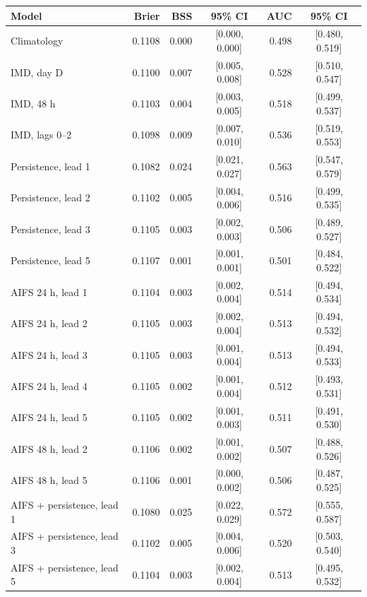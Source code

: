 \begin{tabular}{lrrcrc}\toprule
Model & Brier & BSS & 95\% CI & AUC & 95\% CI \\ \midrule
Climatology & 0.1108 & 0.000 & [0.000, 0.000] & 0.498 & [0.480, 0.519] \\
IMD, day D & 0.1100 & 0.007 & [0.005, 0.008] & 0.528 & [0.510, 0.547] \\
IMD, 48 h & 0.1103 & 0.004 & [0.003, 0.005] & 0.518 & [0.499, 0.537] \\
IMD, lags 0--2 & 0.1098 & 0.009 & [0.007, 0.010] & 0.536 & [0.519, 0.553] \\
\midrule
Persistence, lead 1 & 0.1082 & 0.024 & [0.021, 0.027] & 0.563 & [0.547, 0.579] \\
Persistence, lead 2 & 0.1102 & 0.005 & [0.004, 0.006] & 0.516 & [0.499, 0.535] \\
Persistence, lead 3 & 0.1105 & 0.003 & [0.002, 0.003] & 0.506 & [0.489, 0.527] \\
Persistence, lead 5 & 0.1107 & 0.001 & [0.001, 0.001] & 0.501 & [0.484, 0.522] \\
\midrule
AIFS 24 h, lead 1 & 0.1104 & 0.003 & [0.002, 0.004] & 0.514 & [0.494, 0.534] \\
AIFS 24 h, lead 2 & 0.1105 & 0.003 & [0.002, 0.004] & 0.513 & [0.494, 0.532] \\
AIFS 24 h, lead 3 & 0.1105 & 0.003 & [0.001, 0.004] & 0.513 & [0.494, 0.533] \\
AIFS 24 h, lead 4 & 0.1105 & 0.002 & [0.001, 0.004] & 0.512 & [0.493, 0.531] \\
AIFS 24 h, lead 5 & 0.1105 & 0.002 & [0.001, 0.003] & 0.511 & [0.491, 0.530] \\
\midrule
AIFS 48 h, lead 2 & 0.1106 & 0.002 & [0.001, 0.002] & 0.507 & [0.488, 0.526] \\
AIFS 48 h, lead 5 & 0.1106 & 0.001 & [0.000, 0.002] & 0.506 & [0.487, 0.525] \\
\midrule
AIFS + persistence, lead 1 & 0.1080 & 0.025 & [0.022, 0.029] & 0.572 & [0.555, 0.587] \\
AIFS + persistence, lead 3 & 0.1102 & 0.005 & [0.004, 0.006] & 0.520 & [0.503, 0.540] \\
AIFS + persistence, lead 5 & 0.1104 & 0.003 & [0.002, 0.004] & 0.513 & [0.495, 0.532] \\
\bottomrule\end{tabular}